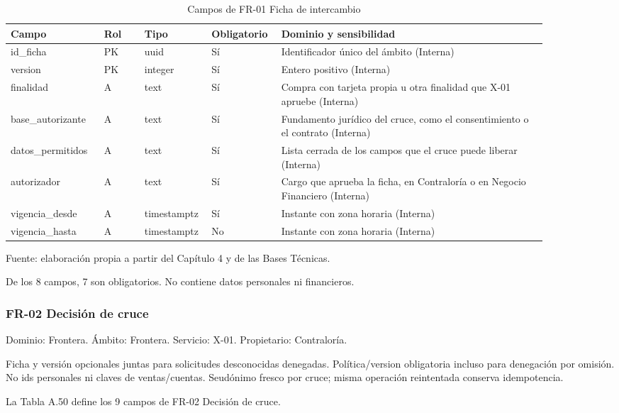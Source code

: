 \documentclass[11pt]{article}
\begin{document}
\begin{table}[htbp]
\caption{Campos de FR-01 Ficha de intercambio}\label{tab:d_fr01}
\centering
\begin{tabular}{@{}p{0.167\linewidth}p{0.070\linewidth}p{0.079\linewidth}p{0.097\linewidth}p{0.465\linewidth}@{}}
\toprule Campo & Rol & Tipo & Obligatorio & Dominio y sensibilidad \\
\midrule
id\_ficha & PK & uuid & Sí & Identificador único del ámbito (Interna) \\
version & PK & integer & Sí & Entero positivo (Interna) \\
finalidad & A & text & Sí & Compra con tarjeta propia u otra finalidad que X-01 apruebe (Interna) \\
base\_autorizante & A & text & Sí & Fundamento jurídico del cruce, como el consentimiento o el contrato (Interna) \\
datos\_permitidos & A & text & Sí & Lista cerrada de los campos que el cruce puede liberar (Interna) \\
autorizador & A & text & Sí & Cargo que aprueba la ficha, en Contraloría o en Negocio Financiero (Interna) \\
vigencia\_desde & A & timestamptz & Sí & Instante con zona horaria (Interna) \\
vigencia\_hasta & A & timestamptz & No & Instante con zona horaria (Interna) \\
\bottomrule
\end{tabular}
\par\smallskip
{\raggedright Fuente: elaboración propia a partir del Capítulo 4 y de las Bases Técnicas.\par}
\end{table}


De los 8 campos, 7 son obligatorios. No contiene datos personales ni financieros.

\subsubsection{FR-02 Decisión de cruce}

Dominio: Frontera. Ámbito: Frontera. Servicio: X-01. Propietario: Contraloría.

Ficha y versión opcionales juntas para solicitudes desconocidas denegadas. Política/version obligatoria incluso para denegación por omisión. No ids personales ni claves de ventas/cuentas. Seudónimo fresco por cruce; misma operación reintentada conserva idempotencia.

La Tabla A.50 define los 9 campos de FR-02 Decisión de cruce.
\end{document}
